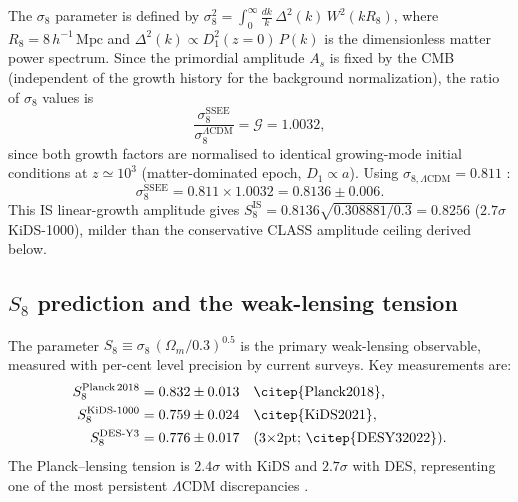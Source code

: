 \documentclass[12pt,a4paper]{article}
\newcommand{\Mpc}{\,\mathrm{Mpc}}
\begin{document}
The $\sigma_8$ parameter is defined by
$\sigma_8^2 = \int_0^\infty \frac{dk}{k}\,\Delta^2(k)\,W^2(kR_8)$,
where $R_8 = 8\,h^{-1}\Mpc$ and $\Delta^2(k) \propto D_1^2(z=0)\,P(k)$ is the
dimensionless matter power spectrum.
Since the primordial amplitude $A_s$ is fixed by the CMB (independent of the
growth history for the background normalization), the ratio of $\sigma_8$ values is
\begin{equation}
  \frac{\sigma_8^{\mathrm{SSEE}}}{\sigma_8^{\Lambda\mathrm{CDM}}}
  = \mathcal{G} = 1.0032,
  \label{eq:sigma8_ratio}
\end{equation}
since both growth factors are normalised to identical growing-mode initial
conditions at $z \simeq 10^3$ (matter-dominated epoch, $D_1 \propto a$).
Using $\sigma_{8,\Lambda\mathrm{CDM}} = 0.811$ \citep{Planck2018}:
\begin{equation}
  \sigma_8^{\mathrm{SSEE}} = 0.811 \times 1.0032 = 0.8136 \pm 0.006.
  \label{eq:sigma8_SSEE}
\end{equation}
This IS linear-growth amplitude gives $S_8^{\mathrm{IS}} = 0.8136\sqrt{0.308881/0.3}
= 0.8256$ ($2.7\sigma$ KiDS-1000), milder than the conservative CLASS amplitude
ceiling derived below.

\subsection{$S_8$ prediction and the weak-lensing tension}
\label{subsec:S8}

The parameter $S_8 \equiv \sigma_8\,(\Omega_m/0.3)^{0.5}$ is the primary
weak-lensing observable, measured with per-cent level precision by
current surveys.
Key measurements are:
\begin{align}
  S_8^{\mathrm{Planck\,2018}} &= 0.832 \pm 0.013 \quad\text{\citep{Planck2018}}, \\
  S_8^{\mathrm{KiDS\text{-}1000}} &= 0.759 \pm 0.024 \quad\text{\citep{KiDS2021}}, \\
  S_8^{\mathrm{DES\text{-}Y3}} &= 0.776 \pm 0.017 \quad\text{(3$\times$2pt; \citep{DESY32022})}.
\end{align}
The Planck–lensing tension is $2.4\sigma$ with KiDS and $2.7\sigma$ with DES,
representing one of the most persistent $\Lambda$CDM discrepancies \citep{Weinberg2013}.
\end{document}
